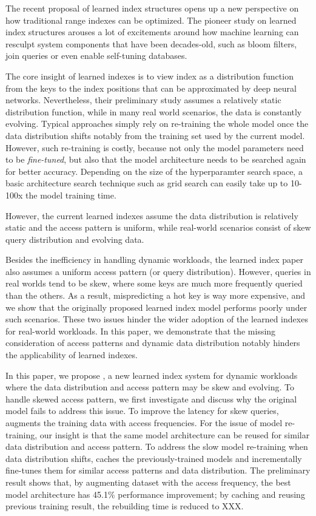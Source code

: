 \begin{englishabstract}

The recent proposal of learned index structures opens up a new perspective on how traditional range indexes can be optimized.
The pioneer study on learned index structures arouses a lot of excitements around how machine learning can resculpt system components that have been decades-old, such as bloom filters, join queries or even enable self-tuning databases.

The core insight of learned indexes is to view index as a distribution function from the keys to the index positions that can be approximated by deep neural networks.
Nevertheless, their preliminary study assumes a relatively static distribution function, while in many real world scenarios, the data is constantly evolving.
Typical approaches simply rely on re-training the whole model once the data distribution shifts notably from the training set used by the current model.
However, such re-training is costly, because not only the model parameters need to be \textit{fine-tuned}, but also that the model architecture needs to be searched again for better accuracy.
Depending on the size of the hyperparamter search space, a basic architecture search technique such as grid search can easily take up to 10-100x the model training time.

However, the current learned indexes assume the data distribution is relatively static and the access pattern is uniform, while real-world scenarios consist of skew query distribution and evolving data.

Besides the inefficiency in handling dynamic workloads, the learned index paper also assumes a uniform access pattern (or query distribution).
However, queries in real worlds tend to be skew, where some keys are much more frequently queried than the others.
As a result, mispredicting a hot key is way more expensive, and we show that the originally proposed learned index model performs poorly under such scenarios.
These two issues hinder the wider adoption of the learned indexes for real-world workloads.
In this paper, we demonstrate that the missing consideration of access patterns and dynamic data distribution notably hinders the applicability of learned indexes.

In this paper, we propose \sys, a new learned index system for dynamic workloads where the data distribution and access pattern may be skew and evolving.
To handle skewed access pattern, we first investigate and discuss why the original model fails to address this issue.
To improve the latency for skew queries, \sys augments the training data with access frequencies.
For the issue of model re-training, our insight is that the same model architecture can be reused for similar data distribution and access pattern.
To address the slow model re-training when data distribution shifts, \sys caches the previously-trained models and incrementally fine-tunes them for similar access patterns and data distribution.
The preliminary result shows that, by augmenting dataset with the access frequency, the best model architecture has 45.1\% performance improvement; by caching and reusing previous training result, the rebuilding time is reduced to XXX.

\end{englishabstract}
